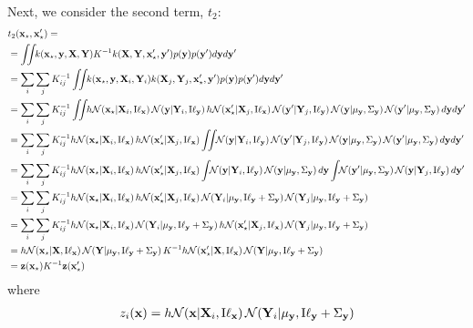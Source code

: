 Next, we consider the second term, $t_2$:
%
\begin{align}
 & t_2(\vx\st, \vx\st') = \\
  & =\int\!\!\! \int\!\! k(\vx\st, \vy, \vX, \vY) K^{-1} k(\vX, \vY, \vx\st', \vy') p(\vy) p(\vy') d\vy d\vy' \\
  & = \sum_i \sum_j K^{-1}_{ij} \int\!\!\! \int\!\! k(\vx\st, \vy, \vX_i, \vY_i) k(\vX_j, \vY_j, \vx\st', \vy') p(\vy) p(\vy') d\vy d\vy'\\
  & = \sum_i \sum_j K^{-1}_{ij} \int\!\!\! \int\!\! h \N{ \vx\st } {\vX_i}{ {\text I} \vell_\vx } \N{ \vy } {\vY_i}{ {\text I} \vell_\vy } h \N{ \vx\st' } {\vX_j}{ {\text I} \vell_\vx } \N{ \vy' } {\vY_j}{ {\text I} \vell_\vy } \N{\vy}{\mu_\vy}{\Sigma_\vy} \N{\vy'}{\mu_\vy}{\Sigma_\vy} d\vy d\vy'\\
  & = \sum_i \sum_j K^{-1}_{ij} h \N{ \vx\st } {\vX_i}{ {\text I} \vell_\vx } h \N{ \vx\st' } {\vX_j}{ {\text I} \vell_\vx } \int\!\!\! \int\!\!  \N{ \vy } {\vY_i}{ {\text I} \vell_\vy }  \N{ \vy' } {\vY_j}{ {\text I} \vell_\vy } \N{\vy}{\mu_\vy}{\Sigma_\vy} \N{\vy'}{\mu_\vy}{\Sigma_\vy} d\vy d\vy'\\
  & = \sum_i \sum_j K^{-1}_{ij} h \N{ \vx\st } {\vX_i}{ {\text I} \vell_\vx } h \N{ \vx\st' } {\vX_j}{ {\text I} \vell_\vx } \int\!\! \N{ \vy } {\vY_i}{ {\text I} \vell_\vy } \N{\vy}{\mu_\vy}{\Sigma_\vy} d\vy \int\!\! \N{\vy'}{\mu_\vy}{\Sigma_\vy} \N{ \vy } {\vY_j}{ {\text I} \vell_\vy } d\vy'\\
  & = \sum_i \sum_j K^{-1}_{ij} h \N{ \vx\st } {\vX_i}{ {\text I} \vell_\vx } h \N{ \vx\st' } {\vX_j}{ {\text I} \vell_\vx } \N{\vY_i}{\mu_\vy}{ {\text I} \vell_\vy + \Sigma_\vy} \N{\vY_j}{\mu_\vy}{ {\text I} \vell_\vy + \Sigma_\vy} \\
  & = \sum_i \sum_j K^{-1}_{ij} h \N{ \vx\st } {\vX_i}{ {\text I} \vell_\vx } \N{\vY_i}{\mu_\vy}{ {\text I} \vell_\vy + \Sigma_\vy} h \N{ \vx\st' } {\vX_j}{ {\text I} \vell_\vx } \N{\vY_j}{\mu_\vy}{ {\text I} \vell_\vy + \Sigma_\vy} \\
  & = h \N{ \vx\st } {\vX}{ {\text I} \vell_\vx } \N{\vY}{\mu_\vy}{ {\text I} \vell_\vy + \Sigma_\vy} K^{-1} h \N{ \vx\st' } {\vX}{ {\text I} \vell_\vx } \N{\vY}{\mu_\vy}{ {\text I} \vell_\vy + \Sigma_\vy} \\
  & = \vz(\vx\st) K^{-1} \vz(\vx\st')
\label{eq:var_double_integral_t2}
\end{align}
where
\begin{align}
z_i({\bf{x}}) = h \mathcal{N}\!\left( {\bf{x}}  \middle| \mathbf{X}_i, {\text I} {\bf{\ell}}_{\bf{x}} \right) \mathcal{N}\!\left(\mathbf{Y}_i \middle| \mu_{\bf{y}}, {\text I} {\bf{\ell}}_{\bf{y}} + \Sigma_{\bf{y}}\right)
\end{align}

